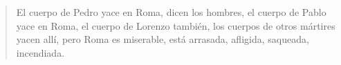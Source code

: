 \begin{quote}
El cuerpo de Pedro yace en Roma, dicen los hombres, el cuerpo de Pablo yace en Roma, el cuerpo de Lorenzo también, los cuerpos de otros mártires yacen allí, pero Roma es miserable, está arrasada, afligida, saqueada, incendiada.
\end{quote}
